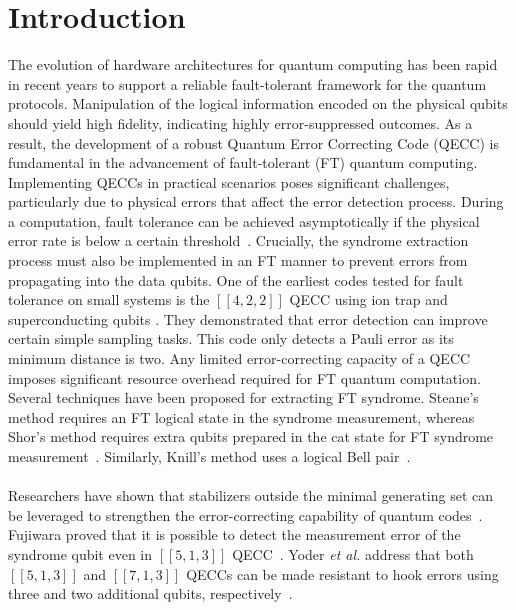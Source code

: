 \documentclass[reprint, amsmath,amssymb, aps,pra,
 floatfix,
]{revtex4-2}
\begin{document}
\section{Introduction}
\label{sec:introduction}

\noindent The evolution of hardware architectures for quantum computing has been rapid in recent years to support a reliable fault-tolerant framework for the quantum protocols.
Manipulation of the logical information encoded on the physical qubits should yield high fidelity, indicating highly error-suppressed outcomes.
As a result, the development of a robust Quantum Error Correcting Code (QECC) is fundamental in the advancement of fault-tolerant (FT) quantum computing.
Implementing QECCs in practical scenarios poses significant challenges, particularly due to physical errors that affect the error detection process. 
During a computation, fault tolerance can be achieved asymptotically if the physical error rate is below a certain threshold~\cite{10.1145/258533.258579, nielsen2010quantum}.
Crucially, the syndrome extraction process must also be implemented in an FT manner to prevent errors from propagating into the data qubits.
One of the earliest codes tested for fault tolerance on small systems is the  $[[4,2,2]]$ QECC using ion trap and superconducting qubits \cite{10.5555/3370220.3370224, PhysRevLett.119.180501}. They demonstrated that error detection can improve certain simple sampling tasks. 
This code only detects a Pauli error as its minimum distance is two.
Any limited error-correcting capacity of a QECC imposes significant resource overhead required for FT quantum computation.
Several techniques have been proposed for extracting FT syndrome.
Steane's method requires an FT logical state in the syndrome measurement, whereas Shor's method requires extra qubits prepared in the cat state for FT syndrome measurement~\cite{PhysRevLett.78.2252,shor1996}.
Similarly, Knill's method uses a logical Bell pair~\cite{Knill2005}.\\\\
\noindent Researchers have shown that stabilizers outside the minimal generating set can be leveraged to strengthen the error-correcting capability of quantum codes~\cite{fujiwara2015high}.
Fujiwara proved that it is possible to detect the measurement error of the syndrome qubit even in $[[5, 1, 3]]$ QECC~\cite{fujiwara2014ability}.
Yoder \emph{et al.} address that both $[[5,1,3]]$ and $[[7,1,3]]$ QECCs can be made resistant to hook errors using three and two additional qubits, respectively~\cite{Yoder2017surfacecodetwist}. 
\end{document}
